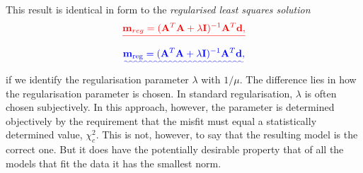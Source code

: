 \documentclass[a4paper,10pt]{paper}
\providecommand{\DIFadd}[1]{{\protect\color{blue}\uwave{#1}}} %
\providecommand{\DIFdel}[1]{{\protect\color{red}\sout{#1}}}                      %
\providecommand{\DIFaddbegin}{} %
\providecommand{\DIFaddend}{} %
\providecommand{\DIFdelbegin}{} %
\providecommand{\DIFdelend}{} %
\begin{document}
\begin{enumerate}
\begin{enumerate}
    This result is identical in form to the \emph{regularised least squares solution}
    \DIFdelbegin \begin{displaymath}
        \DIFdel{\mathbf{m}_{reg}=(\mathbf{A}^{T}\mathbf{A}+\lambda \mathbf{I})^{-1}\mathbf{A}^{T}\mathbf{d},
    }\end{displaymath}%
\DIFdelend \DIFaddbegin \begin{equation*}
        \DIFadd{\mathbf{m}_{\mathrm{reg}}=(\mathbf{A}^{T}\mathbf{A}+\lambda \mathbf{I})^{-1}\mathbf{A}^{T}\mathbf{d},
    }\end{equation*}\DIFaddend 
    if we identify the regularisation parameter $\lambda$ with $1/\mu$. The difference lies in how the regularisation parameter is chosen. In standard regularisation, $\lambda$ is often chosen subjectively. In this approach, however, the
     parameter is determined objectively by the requirement that the misfit must equal a statistically determined value, $\chi_{c}^{2}$. This is not, however, to say that the resulting model is the correct one. But it does have
     the potentially desirable property that of all the models that fit the data it has the smallest norm.
\end{enumerate}





\end{enumerate}
\end{document}
